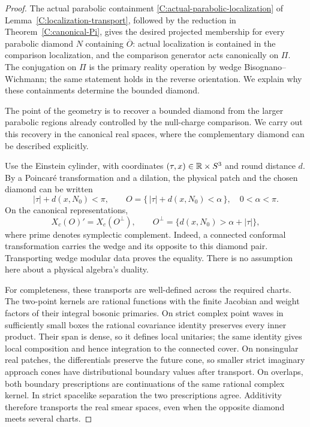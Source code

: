 \begin{proof}
The actual parabolic containment
\eqref{C:actual-parabolic-localization} of
Lemma~\ref{C:localization-transport}, followed by the reduction in
Theorem~\ref{C:canonical-Pi}, gives the desired projected membership
for every parabolic diamond $N$ containing $\overline O$: actual
localization is contained in the comparison localization, and the
comparison generator acts canonically on $\Pi$.
The conjugation on $\Pi$ is the primary reality operation by wedge
Bisognano--Wichmann; the same statement holds in the reverse orientation.
We explain why these containments determine the bounded diamond.

The point of the geometry is to recover a bounded diamond from the
larger parabolic regions already controlled by the null-charge
comparison.  We carry out this recovery in the canonical real spaces,
where the complementary diamond can be described explicitly.

Use the Einstein cylinder, with coordinates $(\tau,x)\in\mathbb R\times S^3$
and round distance $d$.  By a Poincar\'e transformation and a dilation,
the physical patch and the chosen diamond can be written
\[
 |\tau|+d(x,N_0)<\pi,
 \qquad O=\{\,|\tau|+d(x,N_0)<\alpha\,\},\quad 0<\alpha<\pi.
\]
On the canonical representations,
\begin{equation}\label{E:canonical-complement}
 X_c(O)'=X_c(O^\perp),\qquad
 O^\perp=\{d(x,N_0)>\alpha+|\tau|\},
\end{equation}
where prime denotes symplectic complement.  Indeed, a connected conformal
transformation carries the wedge and its opposite to this diamond pair.
Transporting wedge modular data proves the equality.  There is no
assumption here about a physical algebra's duality.

For completeness, these transports are well-defined across the required
charts.  The two-point kernels are rational functions with the finite
Jacobian and weight factors of their integral bosonic primaries.  On
strict complex point waves in sufficiently small boxes the rational
covariance identity preserves every inner product.  Their span is dense,
so it defines local unitaries; the same identity gives local composition
and hence integration to the connected cover.  On nonsingular real
patches, the differentials preserve the future cone, so smaller strict
imaginary approach cones have distributional boundary values after
transport.  On overlaps, both boundary prescriptions are continuations
of the same rational complex kernel.  In strict spacelike separation
the two prescriptions agree.  Additivity therefore transports the real
smear spaces, even when the opposite diamond meets several charts.


\end{proof}
